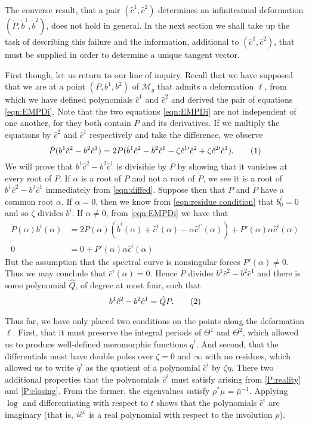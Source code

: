 \documentclass{article}
\begin{document}
The converse result, that a pair $(\hat{c}^1,\hat{c}^2)$ determines an infinitesimal deformation $(\dot P, \dot b^1, \dot b^2)$, does not hold in general. In the next section we shall take up the task of describing this failure and the information, additional to $(\hat{c}^1,\hat{c}^2)$, that must be supplied in order to determine a unique tangent vector.

First though, let us return to our line of inquiry. Recall that we have supposed that we are at a point $(P,b^1,b^2)$ of $\mathcal{M}_g$ that admits a deformation $\ell$, from which we have defined polynomials $\hat{c}^1$ and $\hat{c}^2$ and derived the pair of equations \eqref{eqn:EMPDi}. Note that the two equations \eqref{eqn:EMPDi} are not independent of one another, for they both contain $P$ and its derivatives. If we multiply the equations by $\hat c^2$ and $\hat c^1$ respectively and take the difference, we observe
\[
\dot P (b^1\hat c^2 - b^2\hat c^1) =  2P(\dot b^1\hat c^2 - \dot b^2\hat c^1 - \zeta\hat{c}^{1\prime}\hat c^2 + \zeta\hat{c}^{2\prime}\hat c^1).\labelthis{eqn:diffed}
\]
We will prove that $b^1\hat c^2 - b^2\hat c^1$ is divisible by $P$ by showing that it vanishes at every root of $P$. If $\alpha$ is a root of $P$ and not a root of $\dot{P}$, we see it is a root of $b^1\hat c^2 - b^2 \hat c^1$ immediately from \eqref{eqn:diffed}. Suppose then that $P$ and $\dot P$ have a common root $\alpha$. If $\alpha=0$, then we know from \eqref{eqn:residue condition} that $b^i_0=0$ and so $\zeta$ divides $b^i$. If $\alpha\neq 0$, from \eqref{eqn:EMPDi} we have that
\begin{align*}
\dot P(\alpha) b^i(\alpha) &= 2P(\alpha)\left( \dot b^i(\alpha) + \hat c^i(\alpha) - \alpha\hat{c}^{i\prime}(\alpha)\right) +P'(\alpha)\alpha\hat c^i(\alpha) \\
0 &= 0 + P'(\alpha)\alpha\hat{c}^i(\alpha)
\end{align*}
But the assumption that the spectral curve is nonsingular forces $P'(\alpha)\neq 0$. Thus we may conclude that $\hat{c}^i(\alpha)=0$. Hence $P$ divides $b^1\hat c^2 - b^2 \hat c^1$ and there is some polynomial $\hat{Q}$, of degree at most four, such that
\[
b^1 \hat{c}^2 - b^2 \hat{c}^1 = \hat{Q} P.
\labelthis{eqn:Q hat}
\]

Thus far, we have only placed two conditions on the points along the deformation $\ell$. First, that it must preserve the integral periods of $\Theta^1$ and $\Theta^2$, which allowed us to produce well-defined meromorphic functions $\dot{q}^i$. And second, that the differentials must have double poles over $\zeta=0$ and $\infty$ with no residues, which allowed us to write $\dot{q}^i$ as the quotient of a polynomial $\hat{c}^i$ by $\zeta\eta$. There two additional properties that the polynomials $\hat{c}^i$ must satisfy arising from \ref{P:reality} and \ref{P:closing}. From the former, the eigenvalues satisfy $\rho^* \mu = \bar{\mu}^{-1}$. Applying $\log$ and differentiating with respect to $t$ shows that the polynomials $\hat{c}^i$ are imaginary (that is, $i\hat{c}^i$ is a real polynomial with respect to the involution $\rho$).
\end{document}
